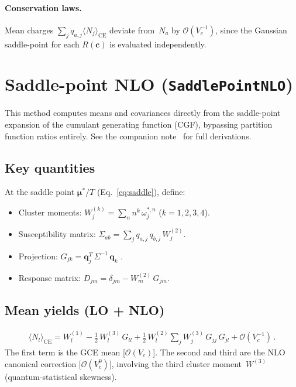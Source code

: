 \documentclass[11pt]{article}
\newcommand{\bmu}{\bm{\mu}}
\newcommand{\bq}{\mathbf{q}}
\newcommand{\bc}{\mathbf{c}}
\newcommand{\CE}{\mathrm{CE}}
\begin{document}
\paragraph{Conservation laws.}
Mean charges $\sum_j q_{a,j}\langle N_j\rangle_\CE$ deviate from~$N_a$ by $\mathcal{O}(V_c^{-1})$, since the Gaussian saddle-point for each $R(\bc)$ is evaluated independently.


\section{Saddle-point NLO (\texttt{SaddlePointNLO})}
\label{sec:SP2}

This method computes means and covariances directly from the saddle-point expansion of the cumulant generating function (CGF), bypassing partition function ratios entirely.
See the companion note~\cite{SaddlePointNote} for full derivations.

\subsection{Key quantities}

At the saddle point $\bmu^*/T$ (Eq.~\ref{eq:saddle}), define:
\begin{itemize}
  \item Cluster moments: $W_j^{(k)} = \sum_n n^k\,\omega_j^{*,n}$ \quad ($k = 1,2,3,4$).
  \item Susceptibility matrix: $\Sigma_{ab} = \sum_j q_{a,j}\,q_{b,j}\,W_j^{(2)}$.
  \item Projection: $G_{jk} = \bq_j^T\,\Sigma^{-1}\,\bq_k$ \quad [$\mathcal{O}(V_c^{-1})$].
  \item Response matrix: $D_{jm} = \delta_{jm} - W_m^{(2)}\,G_{jm}$.
\end{itemize}

\subsection{Mean yields (LO + NLO)}

\begin{align}
  \langle N_l\rangle_\CE
  = W_l^{(1)}
    - \frac{1}{2}\,W_l^{(3)}\,G_{ll}
    + \frac{1}{2}\,W_l^{(2)}\sum_j W_j^{(3)}\,G_{jj}\,G_{jl}
    + \mathcal{O}(V_c^{-1}) \,.
  \label{eq:mean}
\end{align}
The first term is the GCE mean [$\mathcal{O}(V_c)$].
The second and third are the NLO canonical correction [$\mathcal{O}(V_c^0)$], involving the third cluster moment~$W^{(3)}$ (quantum-statistical skewness).
\end{document}
